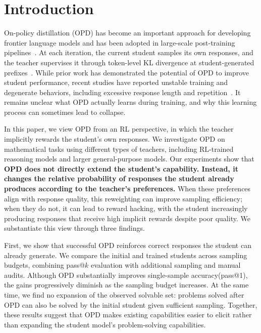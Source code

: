\section{Introduction}

On-policy distillation (OPD) has become an important approach for developing frontier language models and has been adopted in large-scale post-training pipelines~\citep{deepseekai2026deepseekv4highlyefficientmilliontoken, team2026kimi, xiao2026mimo, yang2025qwen3technicalreport, zeng2026glm}.
At each iteration, the current student samples its own responses, and the teacher supervises it through token-level KL divergence at student-generated prefixes~\citep{agarwal2023gkd,gu2024minillm}.
While prior work has demonstrated the potential of OPD to improve student performance, recent studies have reported unstable training and degenerate behaviors, including excessive response length and repetition~\citep{li2026rethinkingopd,zhu2026facesonpolicydistillationpitfalls}.
It remains unclear what OPD actually learns during training, and why this learning process can sometimes lead to collapse.

In this paper, we view OPD from an RL perspective, in which the teacher implicitly rewards the student's own responses.
We investigate OPD on mathematical tasks using different types of teachers, including RL-trained reasoning models and larger general-purpose models.
Our experiments show that
\textbf{OPD does not directly extend the student's capability. Instead, it changes the relative probability of responses the student already produces according to the teacher's preferences.} 
When these preferences align with response quality, this reweighting can improve sampling efficiency; 
when they do not, it can lead to reward hacking, with the student increasingly producing responses that receive high implicit rewards despite poor quality. 
We substantiate this view through three findings.


First, we show that successful OPD reinforces correct responses the student can already generate.
We compare the initial and trained students across sampling budgets, combining pass@$k$ evaluation with additional sampling and manual audits.
Although OPD substantially improves single-sample accuracy(pass@1), the gains progressively diminish as the sampling budget increases.
At the same time, we find no expansion of the observed solvable set: problems solved after OPD can also be solved by the initial student given sufficient sampling.
Together, these results suggest that OPD makes existing capabilities easier to elicit rather than expanding the student model's problem-solving capabilities.


